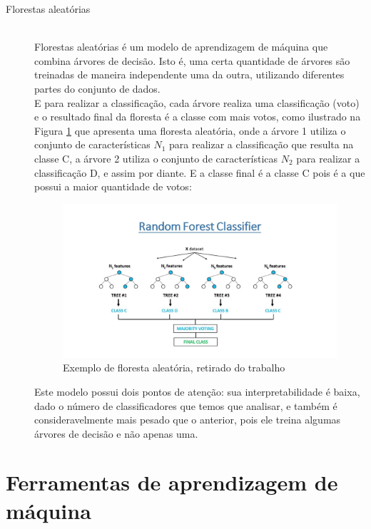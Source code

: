 \begin{description}
    \item[Florestas aleatórias] \hfill \\ Florestas aleatórias é um modelo de aprendizagem 
    de máquina que combina árvores de decisão. Isto é, uma certa quantidade de árvores são 
    treinadas de maneira independente uma da outra, utilizando diferentes partes do conjunto de 
    dados. \\ 
    E para realizar a classificação, cada árvore realiza uma classificação (voto) e o resultado 
    final da floresta é a classe com mais votos, como ilustrado na   Figura \ref{fig:ex_random_forest}
    que apresenta uma floresta aleatória, onde a árvore 1 utiliza o conjunto de características $N_1$ 
    para realizar a classificação que resulta na classe C, a árvore 2 utiliza o conjunto de características $N_2$ 
    para realizar a classificação D, e assim por diante. E a classe final é a classe C pois é a que possui a maior quantidade de votos: \\

    \begin{figure}
        \centering
        \includegraphics[width=.9\textwidth]{figuras/ex_random_forest.jpg}
        \caption{Exemplo de floresta aleatória, retirado do trabalho \cite{ref:imagem_random_forest} \label{fig:ex_random_forest}}
    \end{figure}

    Este modelo possui dois pontos de atenção: sua interpretabilidade é baixa, dado o número de 
    classificadores que temos que analisar, e também é consideravelmente mais pesado que o anterior, 
    pois ele treina algumas árvores de decisão e não apenas uma.
\end{description}

\section{Ferramentas de aprendizagem de máquina}

